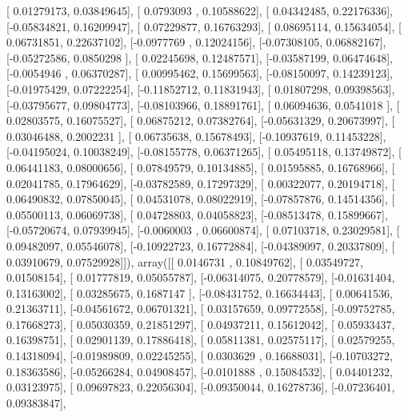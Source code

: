 \documentclass{article}
\begin{document}
       [ 0.01279173,  0.03849645],
       [ 0.0793093 ,  0.10588622],
       [ 0.04342485,  0.22176336],
       [-0.05834821,  0.16209947],
       [ 0.07229877,  0.16763293],
       [ 0.08695114,  0.15634054],
       [ 0.06731851,  0.22637102],
       [-0.0977769 ,  0.12024156],
       [-0.07308105,  0.06882167],
       [-0.05272586,  0.0850298 ],
       [ 0.02245698,  0.12487571],
       [-0.03587199,  0.06474648],
       [-0.0054946 ,  0.06370287],
       [ 0.00995462,  0.15699563],
       [-0.08150097,  0.14239123],
       [-0.01975429,  0.07222254],
       [-0.11852712,  0.11831943],
       [ 0.01807298,  0.09398563],
       [-0.03795677,  0.09804773],
       [-0.08103966,  0.18891761],
       [ 0.06094636,  0.0541018 ],
       [ 0.02803575,  0.16075527],
       [ 0.06875212,  0.07382764],
       [-0.05631329,  0.20673997],
       [ 0.03046488,  0.2002231 ],
       [ 0.06735638,  0.15678493],
       [-0.10937619,  0.11453228],
       [-0.04195024,  0.10038249],
       [-0.08155778,  0.06371265],
       [ 0.05495118,  0.13749872],
       [ 0.06441183,  0.08000656],
       [ 0.07849579,  0.10134885],
       [ 0.01595885,  0.16768966],
       [ 0.02041785,  0.17964629],
       [-0.03782589,  0.17297329],
       [ 0.00322077,  0.20194718],
       [ 0.06490832,  0.07850045],
       [ 0.04531078,  0.08022919],
       [-0.07857876,  0.14514356],
       [ 0.05500113,  0.06069738],
       [ 0.04728803,  0.04058823],
       [-0.08513478,  0.15899667],
       [-0.05720674,  0.07939945],
       [-0.0060003 ,  0.06600874],
       [ 0.07103718,  0.23029581],
       [ 0.09482097,  0.05546078],
       [-0.10922723,  0.16772884],
       [-0.04389097,  0.20337809],
       [ 0.03910679,  0.07529928]]), array([[ 0.0146731 ,  0.10849762],
       [ 0.03549727,  0.01508154],
       [ 0.01777819,  0.05055787],
       [-0.06314075,  0.20778579],
       [-0.01631404,  0.13163002],
       [ 0.03285675,  0.1687147 ],
       [-0.08431752,  0.16634443],
       [ 0.00641536,  0.21363711],
       [-0.04561672,  0.06701321],
       [ 0.03157659,  0.09772558],
       [-0.09752785,  0.17668273],
       [ 0.05030359,  0.21851297],
       [ 0.04937211,  0.15612042],
       [ 0.05933437,  0.16398751],
       [ 0.02901139,  0.17886418],
       [ 0.05811381,  0.02575117],
       [ 0.02579255,  0.14318094],
       [-0.01989809,  0.02245255],
       [ 0.0303629 ,  0.16688031],
       [-0.10703272,  0.18363586],
       [-0.05266284,  0.04908457],
       [-0.0101888 ,  0.15084532],
       [ 0.04401232,  0.03123975],
       [ 0.09697823,  0.22056304],
       [-0.09350044,  0.16278736],
       [-0.07236401,  0.09383847],
\end{document}
